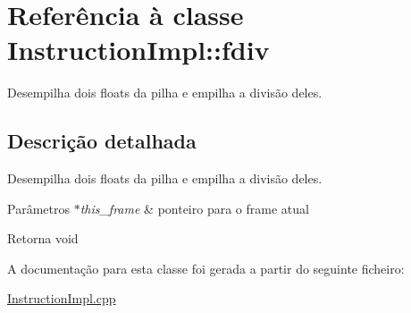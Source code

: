 \hypertarget{class_instruction_impl_1_1fdiv}{}\section{Referência à classe Instruction\+Impl\+:\+:fdiv}
\label{class_instruction_impl_1_1fdiv}


Desempilha dois floats da pilha e empilha a divisão deles.  




\subsection{Descrição detalhada}
Desempilha dois floats da pilha e empilha a divisão deles. 


\begin{DoxyParams}{Parâmetros}
{\em $\ast$this\+\_\+frame} & ponteiro para o frame atual \\
\hline
\end{DoxyParams}
\begin{DoxyReturn}{Retorna}
void 
\end{DoxyReturn}


A documentação para esta classe foi gerada a partir do seguinte ficheiro\+:\begin{DoxyCompactItemize}
\item 
\hyperlink{_instruction_impl_8cpp}{Instruction\+Impl.\+cpp}\end{DoxyCompactItemize}
